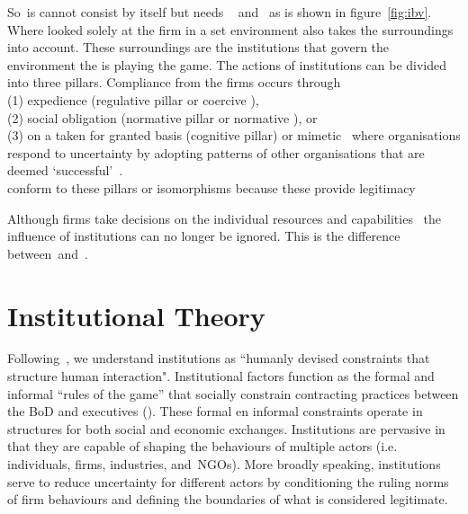 So~\ibv is cannot consist by itself but needs \rbv~\cite{Barney:1991} and~\cite{Porter:1980} as is shown in figure~\ref{fig:ibv}. 
Where \rbv looked solely at the firm in a set environment \ibv also takes the surroundings into account. These surroundings are the institutions that govern the environment the \mne is playing the game. 
The actions of institutions can be divided into three pillars. Compliance from the firms occurs through \\(1) expedience (regulative pillar or coercive \iso),\\
 (2) social obligation (normative pillar or normative \iso), or \\
 (3) on a taken for granted basis (cognitive pillar) or mimetic \iso~where organisations respond to uncertainty by adopting patterns of other organisations that are deemed `successful'~\cite{Westney:2005,Peng:2008,Kostova:1999,DiMaggio:1983,Scott:1995}.\\ 
\mne conform to these pillars or isomorphisms because these provide legitimacy~\cite{Powell:1991}

Although firms take decisions on the individual resources and capabilities~\cite{Barney:1991} the influence of institutions can no longer be ignored. This is the difference between~\rbv and~\ibv. 







\section{Institutional Theory}


Following~\cite{North:1990}, we understand institutions as ``humanly devised constraints
that structure human interaction". Institutional factors function as the formal and
informal ``rules of the game'' that socially constrain contracting practices between the \gls{BoD} and 
executives (\cite{North:1990}).  
These formal en informal constraints operate in structures for both social and economic exchanges. 
Institutions are pervasive in that they are capable of shaping the behaviours of multiple actors (i.e. 
individuals, firms, industries, and~\glspl{NGO}). More broadly speaking, institutions serve to reduce 
uncertainty for different actors by conditioning the ruling norms of firm behaviours and defining the 
boundaries of what is considered legitimate.~\cite{Peng:2008}\\



